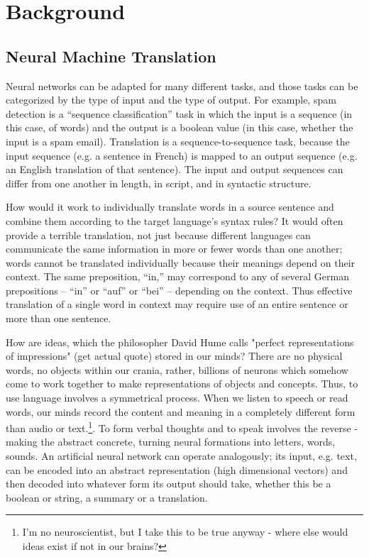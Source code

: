 \chapter{Background}
\label{chap:background}

\section{Neural Machine Translation}

Neural networks can be adapted for many different tasks, and those tasks can be categorized by the type of input and the type of output. For example, spam detection is a “sequence classification” task in which the input is a sequence (in this case, of words) and the output is a boolean value (in this case, whether the input is a spam email). Translation is a sequence-to-sequence task, because the input sequence (e.g. a sentence in French) is mapped to an output sequence (e.g. an English translation of that sentence). The input and output sequences can differ from one another in length, in script, and in syntactic structure.

How would it work to individually translate words in a source sentence and combine them according to the target language’s syntax rules? It would often provide a terrible translation, not just because different languages can communicate the same information in more or fewer words than one another; words cannot be translated individually because their meanings depend on their context. The same preposition, “in,” may correspond to any of several German prepositions – “in” or “auf” or “bei” – depending on the context. Thus effective translation of a single word in context may require use of an entire sentence or more than one sentence.

How are ideas, which the philosopher David Hume calls "perfect representations of impressions" (get actual quote) stored in our minds? There are no physical words, no objects within our crania, rather, billions of neurons which somehow come to work together to make representations of objects and concepts. Thus, to use language involves a symmetrical process. When we listen to speech or read words, our minds record the content and meaning in a completely different form than audio or text.\footnote{I'm no neuroscientist, but I take this to be true anyway - where else would ideas exist if not in our brains?}. To form verbal thoughts and to speak involves the reverse - making the abstract concrete, turning neural formations into letters, words, sounds. An artificial neural network can operate analogously; its input, e.g. text, can be encoded into an abstract representation (high dimensional vectors) and then decoded into whatever form its output should take, whether this be a boolean or string, a summary or a translation.  

